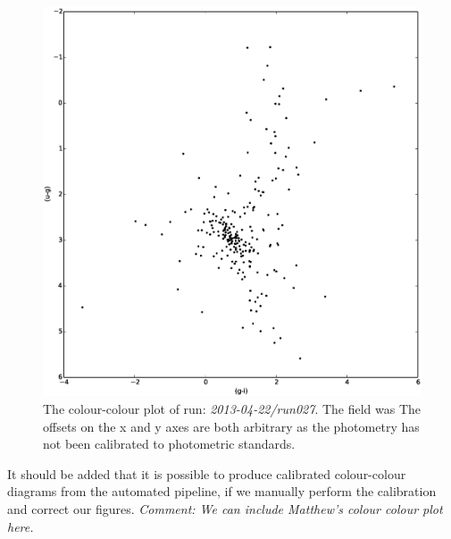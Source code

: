 \begin{figure}[!h]
\centering
\includegraphics[width=120mm]{images/2010-04-22-run027-2colour.eps}
\caption{The colour-colour plot of run: \emph{2013-04-22/run027}. The field was  The offsets on the x and y axes are both arbitrary as the photometry has not been calibrated to photometric standards.}
\label{fig:differentialtrad}
\end{figure}

It should be added that it is possible to produce calibrated colour-colour diagrams from the automated pipeline, if we manually perform the calibration and correct our figures. \emph{Comment: We can include Matthew's colour colour plot here.} 
